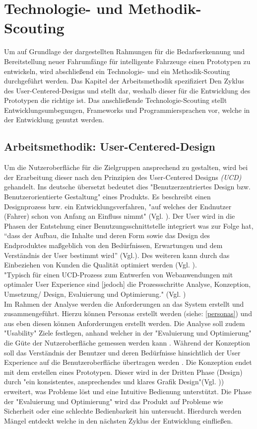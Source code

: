 \section{Technologie- und Methodik-Scouting}
Um auf Grundlage der dargestellten Rahmungen für die Bedarfserkennung und Bereitstellung neuer Fahrumfänge für intelligente Fahrzeuge einen Prototypen zu entwickeln, wird abschließend ein Technologie- und ein Methodik-Scouting durchgeführt werden. Das Kapitel der Arbeitsmethodik spezifiziert Den Zyklus des User-Centered-Designs und stellt dar, weshalb dieser für die Entwicklung des Prototypen die richtige ist. Das anschließende Technologie-Scouting stellt Entwicklungsumbegungen, Frameworks und Programmiersprachen vor, welche in der Entwicklung genutzt werden. 
\subsection{Arbeitsmethodik: User-Centered-Design}
Um die Nutzeroberfläche für die Zielgruppen ansprechend zu gestalten, wird bei der Erarbeitung dieser nach den Prinzipien des User-Centered Designs \textit{(UCD)} gehandelt. Ins deutsche übersetzt bedeutet dies "Benutzerzentriertes Design bzw. Benutzerorientierte Gestaltung" eines Produkts. Es beschreibt einen Designprozess bzw. ein Entwicklungsverfahren, "auf welches der Endnutzer (Fahrer) schon von Anfang an Einfluss nimmt" (Vgl. \cite[S.763]{bainbridge2004berkshire}). Der User wird in die Phasen der Entstehung einer Benutzungsschnittstelle integriert was zur Folge hat, “dass der Aufbau, die Inhalte und deren Form sowie das Design des Endproduktes maßgeblich von den Bedürfnissen, Erwartungen und dem Verständnis der User bestimmt wird” (Vgl.\cite{rosenbusch}). Des weiteren kann durch das Einbeziehen von Kunden die Qualität optimiert werden (Vgl. \cite[S. 14]{weisgerber}).\\

"Typisch für einen UCD-Prozess zum Entwerfen von Webanwendungen mit optimaler User Experience sind [jedoch] die Prozessschritte Analyse, Konzeption, Umsetzung/ Design, Evaluierung und Optimierung." (Vgl. \cite{seobility})\\
Im Rahmen der Analyse werden die Anforderungen an das System erstellt und zusammengeführt. Hierzu können Personas erstellt werden (siehe: \ref{personas}) und aus eben diesen können Anforderungen erstellt werden. Die Analyse soll zudem "Usability"\cite{usability-toolkit} Ziele festlegen, anhand welcher in der "Evaluierung und Optimierung" die Güte der Nutzeroberfläche gemessen werden kann \cite{seobility}. Während der Konzeption soll das Verständnis der Benutzer und deren Bedürfnisse hinsichtlich der User Experience auf die Benutzeroberfläche übertragen werden \cite[(ebd.)]{seobility}. Die Konzeption endet mit dem erstellen eines Prototypen. Dieser wird in der Dritten Phase (Design) durch "ein konsistentes, ansprechendes und klares Grafik Design"(Vgl. )\cite{seobility}) erweitert, was Probleme löst und eine Intuitive Bedienung unterstützt. Die Phase der "Evaluierung und Optimierung" wird das Produkt auf Probleme wie Sicherheit oder eine schlechte Bedienbarkeit hin untersucht. Hierdurch werden Mängel entdeckt welche in den nächsten Zyklus der Entwicklung einfließen.\\

